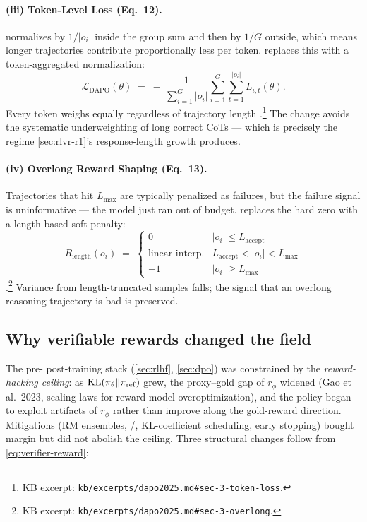 \paragraph{(iii) Token-Level Loss (Eq.\ 12).}  normalizes by
$1/|o_i|$ inside the group sum and then by $1/G$ outside, which means
longer trajectories contribute proportionally less per token. 
replaces this with a token-aggregated normalization:
\begin{equation}
\mathcal{L}_{\mathrm{DAPO}}(\theta) \;=\; -\,\frac{1}{\sum_{i=1}^{G} |o_i|} \sum_{i=1}^{G} \sum_{t=1}^{|o_i|} L_{i,t}(\theta).
\label{eq:dapo-tokenloss}
\end{equation}
Every token weighs equally regardless of trajectory length
\citep[Eq.\ 12]{dapo2025}.\footnote{KB excerpt:
\nolinkurl{kb/excerpts/dapo2025.md#sec-3-token-loss}.} The change avoids
the systematic underweighting of long correct CoTs — which is precisely
the regime \cref{sec:rlvr-r1}'s response-length growth produces.

\paragraph{(iv) Overlong Reward Shaping (Eq.\ 13).} Trajectories that
hit $L_{\max}$ are typically penalized as failures, but the failure
signal is uninformative — the model just ran out of budget. 
replaces the hard zero with a length-based soft penalty:
\begin{equation}
R_{\mathrm{length}}(o_i) \;=\; \begin{cases}
0 & |o_i| \le L_{\mathrm{accept}} \\
\text{linear interp.} & L_{\mathrm{accept}} < |o_i| < L_{\max} \\
-1 & |o_i| \ge L_{\max}
\end{cases}
\label{eq:dapo-overlong}
\end{equation}
\citep[Eq.\ 13]{dapo2025}.\footnote{KB excerpt:
\nolinkurl{kb/excerpts/dapo2025.md#sec-3-overlong}.} Variance from
length-truncated samples falls; the signal that an overlong
reasoning trajectory is bad is preserved.

\subsection{Why verifiable rewards changed the field}
\label{sec:rlvr-why}

The pre- post-training stack (\cref{sec:rlhf}, \cref{sec:dpo}) was
constrained by the \emph{reward-hacking ceiling}: as
$\operatorname{KL}(\pi_\theta \| \pi_{\mathrm{ref}})$ grew, the proxy--gold gap of
$r_\phi$ widened (Gao et al.\ 2023, scaling laws for reward-model
overoptimization), and the policy began to
exploit artifacts of $r_\phi$ rather than improve along the gold-reward
direction. Mitigations (RM ensembles, /, KL-coefficient
scheduling, early stopping) bought margin but did not abolish the
ceiling. Three structural changes follow from \cref{eq:verifier-reward}:

